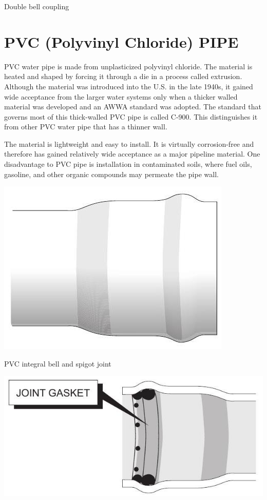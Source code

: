 \documentclass[10pt]{article}
\begin{document}
Double bell coupling

\section{PVC (Polyvinyl Chloride) PIPE}
PVC water pipe is made from unplasticized polyvinyl chloride. The material is heated and shaped by forcing it through a die in a process called extrusion. Although the material was introduced into the U.S. in the late 1940s, it gained wide acceptance from the larger water systems only when a thicker walled material was developed and an AWWA standard was adopted. The standard that governs most of this thick-walled PVC pipe is called C-900. This distinguishes it from other PVC water pipe that has a thinner wall.

The material is lightweight and easy to install. It is virtually corrosion-free and therefore has gained relatively wide acceptance as a major pipeline material. One disadvantage to PVC pipe is installation in contaminated soils, where fuel oils, gasoline, and other organic compounds may permeate the pipe wall.

\includegraphics[max width=\textwidth]{PVCIntegralBellSpigotJoint}

PVC integral bell and spigot joint

\includegraphics[max width=\textwidth]{PVCIntegralBellSpigotJoint1}
\end{document}
